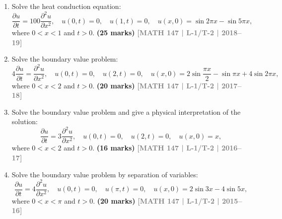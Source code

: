 \documentclass[12pt,a3paper]{article}
\newcommand{\yr}[1]{\hfill\textcolor{gray}{\small\textbf{[#1]}}}
\newcommand{\mk}[1]{\textcolor{orange!70!black}{\small\textbf{(#1 marks)}}}
\begin{document}
\begin{enumerate}
\item Solve the heat conduction equation:
\[
\frac{\partial u}{\partial t}=100\frac{\partial^{2}u}{\partial x^{2}},\quad u(0,t)=0,\quad u(1,t)=0,\quad u(x,0)=\sin 2\pi x-\sin 5\pi x,
\]
where $0<x<1$ and $t>0$.
\mk{25} \yr{MATH 147 | L-1/T-2 | 2018--19}


\item Solve the boundary value problem:
\[
4\frac{\partial u}{\partial t}=\frac{\partial^{2}u}{\partial x^{2}},\quad u(0,t)=0,\quad u(2,t)=0,\quad u(x,0)=2\sin\frac{\pi x}{2}-\sin\pi x+4\sin 2\pi x,
\]
where $0<x<2$ and $t>0$.
\mk{20} \yr{MATH 147 | L-1/T-2 | 2017--18}


\item Solve the boundary value problem and give a physical interpretation of the solution:
\[
\frac{\partial u}{\partial t}=3\frac{\partial^{2}u}{\partial x^{2}},\quad u(0,t)=0,\quad u(2,t)=0,\quad u(x,0)=x,
\]
where $0<x<2$ and $t>0$.
\mk{16} \yr{MATH 147 | L-1/T-2 | 2016--17}


\item Solve the boundary value problem by separation of variables:
\[
\frac{\partial u}{\partial t}=4\frac{\partial^{2}u}{\partial x^{2}},\quad u(0,t)=0,\quad u(\pi,t)=0,\quad u(x,0)=2\sin 3x-4\sin 5x,
\]
where $0<x<\pi$ and $t>0$.
\mk{20} \yr{MATH 147 | L-1/T-2 | 2015--16}


\end{enumerate}
\end{document}
